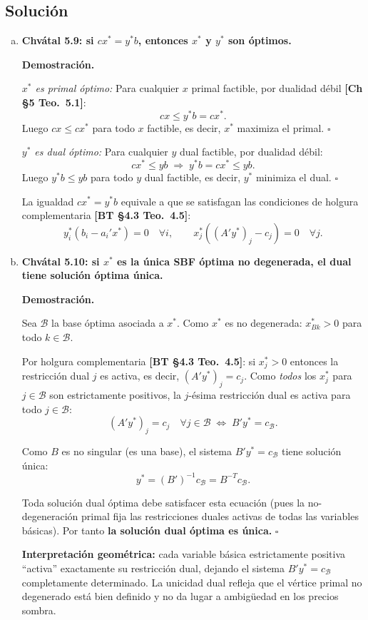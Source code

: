 \documentclass{article}
\begin{document}
\subsection*{Solución}

\begin{enumerate}[a)]

\item \textbf{Chvátal 5.9: si $cx^* = y^*b$, entonces $x^*$ y $y^*$ son óptimos.}

\textbf{Demostración.}

\textit{$x^*$ es primal óptimo:} Para cualquier $x$ primal factible, por dualidad débil \textbf{[Ch §5 Teo.\ 5.1]}:
\[
  cx \leq y^*b = cx^*.
\]
Luego $cx \leq cx^*$ para todo $x$ factible, es decir, $x^*$ maximiza el primal. $\square$

\textit{$y^*$ es dual óptimo:} Para cualquier $y$ dual factible, por dualidad débil:
\[
  cx^* \leq yb \;\Rightarrow\; y^*b = cx^* \leq yb.
\]
Luego $y^*b \leq yb$ para todo $y$ dual factible, es decir, $y^*$ minimiza el dual. $\square$

La igualdad $cx^* = y^*b$ equivale a que se satisfagan las condiciones de holgura complementaria \textbf{[BT §4.3 Teo.\ 4.5]}:
\[
  y_i^*(b_i - a_i'x^*) = 0 \quad \forall i, \qquad x_j^*((A'y^*)_j - c_j) = 0 \quad \forall j.
\]

\item \textbf{Chvátal 5.10: si $x^*$ es la única SBF óptima no degenerada, el dual tiene solución óptima única.}

\textbf{Demostración.}

Sea $\mathcal{B}$ la base óptima asociada a $x^*$. Como $x^*$ es no degenerada: $x_{Bk}^* > 0$ para todo $k \in \mathcal{B}$.

Por holgura complementaria \textbf{[BT §4.3 Teo.\ 4.5]}: si $x_j^* > 0$ entonces la restricción dual $j$ es activa, es decir, $(A'y^*)_j = c_j$. Como \emph{todos} los $x_j^*$ para $j \in \mathcal{B}$ son estrictamente positivos, la $j$-ésima restricción dual es activa para todo $j \in \mathcal{B}$:
\[
  (A'y^*)_j = c_j \quad \forall j \in \mathcal{B} \;\Leftrightarrow\; B'y^* = c_{\mathcal{B}}.
\]

Como $B$ es no singular (es una base), el sistema $B'y^* = c_{\mathcal{B}}$ tiene solución única:
\[
  y^* = (B')^{-1}c_{\mathcal{B}} = B^{-T}c_{\mathcal{B}}.
\]

Toda solución dual óptima debe satisfacer esta ecuación (pues la no-degeneración primal fija las restricciones duales activas de todas las variables básicas). Por tanto \textbf{la solución dual óptima es única.} $\square$

\textbf{Interpretación geométrica:} cada variable básica estrictamente positiva ``activa'' exactamente su restricción dual, dejando el sistema $B'y^* = c_{\mathcal{B}}$ completamente determinado. La unicidad dual refleja que el vértice primal no degenerado está bien definido y no da lugar a ambigüedad en los precios sombra.

\end{enumerate}
\end{document}
